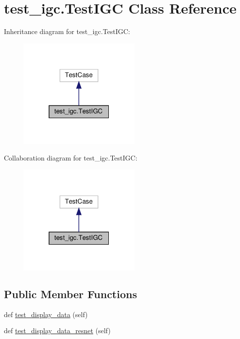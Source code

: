 \hypertarget{classtest__igc_1_1TestIGC}{}\section{test\+\_\+igc.\+Test\+I\+GC Class Reference}
\label{classtest__igc_1_1TestIGC}


Inheritance diagram for test\+\_\+igc.\+Test\+I\+GC\+:
\nopagebreak
\begin{figure}[H]
\begin{center}
\leavevmode
\includegraphics[width=172pt]{da/d7c/classtest__igc_1_1TestIGC__inherit__graph}
\end{center}
\end{figure}


Collaboration diagram for test\+\_\+igc.\+Test\+I\+GC\+:
\nopagebreak
\begin{figure}[H]
\begin{center}
\leavevmode
\includegraphics[width=172pt]{da/d7d/classtest__igc_1_1TestIGC__coll__graph}
\end{center}
\end{figure}
\subsection*{Public Member Functions}
\begin{DoxyCompactItemize}
\item 
def \hyperlink{classtest__igc_1_1TestIGC_a3e0489229f985e12587c593781cf785a}{test\+\_\+display\+\_\+data} (self)
\item 
def \hyperlink{classtest__igc_1_1TestIGC_a2637e70c3cf17a0304a0d10cebf76937}{test\+\_\+display\+\_\+data\+\_\+resnet} (self)
\end{DoxyCompactItemize}
